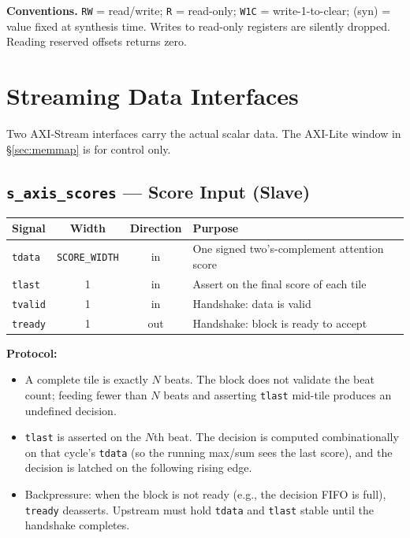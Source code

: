 \documentclass[11pt]{article}
\begin{document}
\medskip
\noindent\textbf{Conventions.} \texttt{RW} = read/write; \texttt{R} = read-only;
\texttt{W1C} = write-1-to-clear; (syn) = value fixed at synthesis time.
Writes to read-only registers are silently dropped. Reading reserved offsets
returns zero.

\section{Streaming Data Interfaces}
\label{sec:stream}

Two AXI-Stream interfaces carry the actual scalar data. The AXI-Lite window in
\S\ref{sec:memmap} is for control only.

\subsection{\texttt{s\_axis\_scores} --- Score Input (Slave)}
\label{sec:s_axis_scores}

\begin{table}[h]
\centering
\small
\begin{tabular}{@{}l c c p{8cm}@{}}
\toprule
Signal      & Width                  & Direction & Purpose \\
\midrule
\texttt{tdata}  & \texttt{SCORE\_WIDTH} & in        & One signed two's-complement attention score \\
\texttt{tlast}  & 1                     & in        & Assert on the final score of each tile \\
\texttt{tvalid} & 1                     & in        & Handshake: data is valid \\
\texttt{tready} & 1                     & out       & Handshake: block is ready to accept \\
\bottomrule
\end{tabular}
\end{table}

\noindent\textbf{Protocol:}
\begin{itemize}
\item A complete tile is exactly $N$ beats. The block does not validate the
  beat count; feeding fewer than $N$ beats and asserting \texttt{tlast}
  mid-tile produces an undefined decision.
\item \texttt{tlast} is asserted on the $N$th beat. The decision is computed
  combinationally on that cycle's \texttt{tdata} (so the running max/sum
  sees the last score), and the decision is latched on the following rising
  edge.
\item Backpressure: when the block is not ready (e.g., the decision FIFO is
  full), \texttt{tready} deasserts. Upstream must hold \texttt{tdata} and
  \texttt{tlast} stable until the handshake completes.
\end{itemize}
\end{document}
